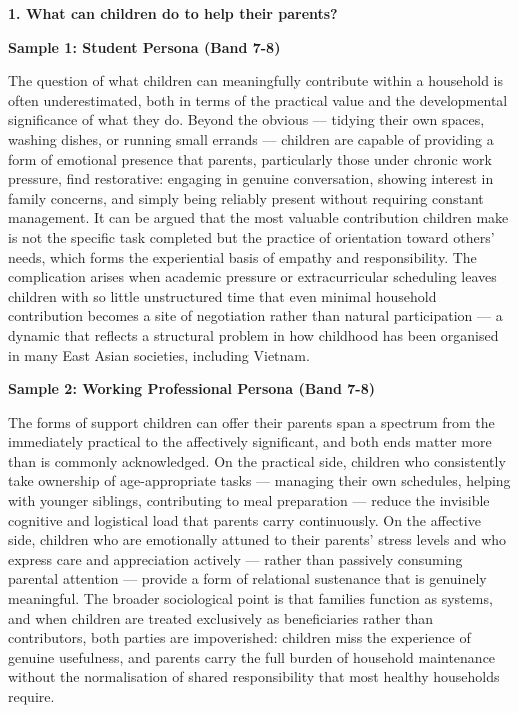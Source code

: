 \partthreeheader

\begin{ieltsquestion}
\textbf{1. What can children do to help their parents?}
\end{ieltsquestion}
\textbf{Sample 1: Student Persona (Band 7-8)}

The question of what children can meaningfully contribute within a household is often underestimated, both in terms of the practical value and the developmental significance of what they do. Beyond the obvious — tidying their own spaces, washing dishes, or running small errands — children are capable of providing a form of emotional presence that parents, particularly those under chronic work pressure, find restorative: engaging in genuine conversation, showing interest in family concerns, and simply being reliably present without requiring constant management. It can be argued that the most valuable contribution children make is not the specific task completed but the practice of orientation toward others' needs, which forms the experiential basis of empathy and responsibility. The complication arises when academic pressure or extracurricular scheduling leaves children with so little unstructured time that even minimal household contribution becomes a site of negotiation rather than natural participation — a dynamic that reflects a structural problem in how childhood has been organised in many East Asian societies, including Vietnam.

\textbf{Sample 2: Working Professional Persona (Band 7-8)}

The forms of support children can offer their parents span a spectrum from the immediately practical to the affectively significant, and both ends matter more than is commonly acknowledged. On the practical side, children who consistently take ownership of age-appropriate tasks — managing their own schedules, helping with younger siblings, contributing to meal preparation — reduce the invisible cognitive and logistical load that parents carry continuously. On the affective side, children who are emotionally attuned to their parents' stress levels and who express care and appreciation actively — rather than passively consuming parental attention — provide a form of relational sustenance that is genuinely meaningful. The broader sociological point is that families function as systems, and when children are treated exclusively as beneficiaries rather than contributors, both parties are impoverished: children miss the experience of genuine usefulness, and parents carry the full burden of household maintenance without the normalisation of shared responsibility that most healthy households require.

